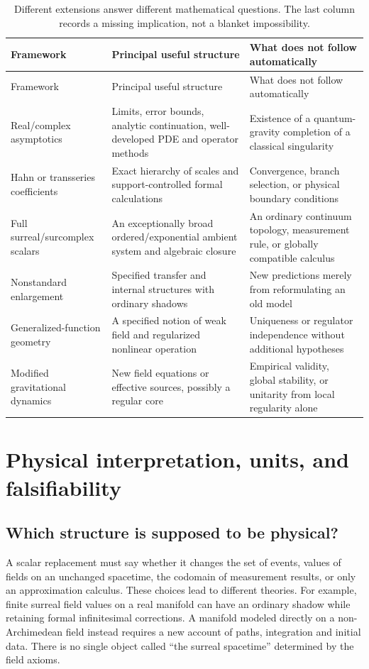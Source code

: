\documentclass[11pt,a4paper]{article}
\numberwithin{equation}{section}
\theoremstyle{definition}
\theoremstyle{remark}
\begin{document}
\begin{longtable}{@{}>{\raggedright\arraybackslash}p{}
  >{\raggedright\arraybackslash}p{}
  >{\raggedright\arraybackslash}p{}@{}}
\caption{Different extensions answer different mathematical questions. The
last column records a missing implication, not a blanket impossibility.}
\label{tab:comparison}\\
\toprule
Framework & Principal useful structure & What does not follow automatically\\
\midrule
\endfirsthead
\toprule
Framework & Principal useful structure & What does not follow automatically\\
\midrule
\endhead
\bottomrule
\endfoot
Real/complex asymptotics & Limits, error bounds, analytic continuation,
well-developed PDE and operator methods & Existence of a quantum-gravity
completion of a classical singularity\\[5pt]
Hahn or transseries coefficients & Exact hierarchy of scales and
support-controlled formal calculations & Convergence, branch selection, or
physical boundary conditions\\[5pt]
Full surreal/surcomplex scalars & An exceptionally broad ordered/exponential
ambient system and algebraic closure & An ordinary continuum topology,
measurement rule, or globally compatible calculus\\[5pt]
Nonstandard enlargement & Specified transfer and internal structures with
ordinary shadows & New predictions merely from reformulating an old model\\[5pt]
Generalized-function geometry & A specified notion of weak field and
regularized nonlinear operation & Uniqueness or regulator independence without
additional hypotheses\\[5pt]
Modified gravitational dynamics & New field equations or effective sources,
possibly a regular core & Empirical validity, global stability, or unitarity
from local regularity alone\\
\end{longtable}

\section{Physical interpretation, units, and falsifiability}\label{sec:interpretation}

\subsection{Which structure is supposed to be physical?}
A scalar replacement must say whether it changes the set of events, values of
fields on an unchanged spacetime, the codomain of measurement results, or only
an approximation calculus. These choices lead to different theories.
For example, finite surreal field values on a real manifold can have an
ordinary shadow while retaining formal infinitesimal corrections. A manifold
modeled directly on a non-Archimedean field instead requires a new account of
paths, integration and initial data. There is no single object called ``the
surreal spacetime'' determined by the field axioms.
\end{document}
